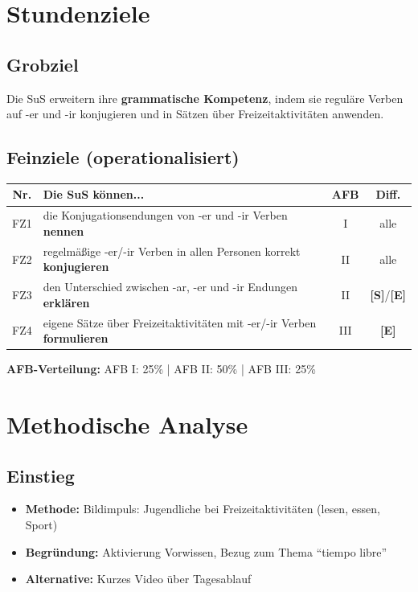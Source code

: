 \documentclass[11pt,a4paper]{article}
\newcommand{\Std}{\textcolor{standard}{\textbf{[S]}}}
\newcommand{\E}{\textcolor{erweiterung}{\textbf{[E]}}}
\begin{document}
\section{Stundenziele}

\subsection{Grobziel}
Die SuS erweitern ihre \textbf{grammatische Kompetenz}, indem sie reguläre Verben auf -er und -ir konjugieren und in Sätzen über Freizeitaktivitäten anwenden.

\subsection{Feinziele (operationalisiert)}
\begin{tabular}{|c|p{7.5cm}|c|c|}
\hline
\textbf{Nr.} & \textbf{Die SuS können...} & \textbf{AFB} & \textbf{Diff.} \\
\hline
FZ1 & die Konjugationsendungen von -er und -ir Verben \textbf{nennen} & I & alle \\
\hline
FZ2 & regelmäßige -er/-ir Verben in allen Personen korrekt \textbf{konjugieren} & II & alle \\
\hline
FZ3 & den Unterschied zwischen -ar, -er und -ir Endungen \textbf{erklären} & II & \Std{}/\E{} \\
\hline
FZ4 & eigene Sätze über Freizeitaktivitäten mit -er/-ir Verben \textbf{formulieren} & III & \E{} \\
\hline
\end{tabular}

\vspace{1em}
\textbf{AFB-Verteilung:} AFB I: 25\% | AFB II: 50\% | AFB III: 25\%

\section{Methodische Analyse}

\subsection{Einstieg}
\begin{itemize}
    \item \textbf{Methode:} Bildimpuls: Jugendliche bei Freizeitaktivitäten (lesen, essen, Sport)
    \item \textbf{Begründung:} Aktivierung Vorwissen, Bezug zum Thema ``tiempo libre''
    \item \textbf{Alternative:} Kurzes Video über Tagesablauf
\end{itemize}
\end{document}
